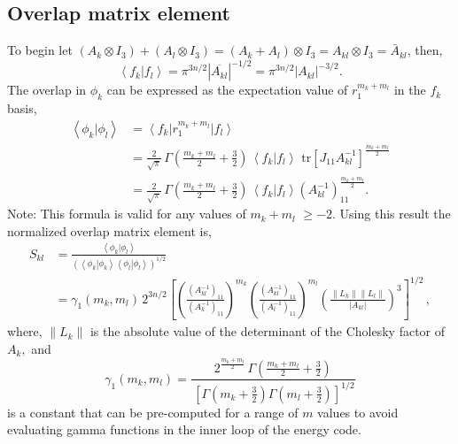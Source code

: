 \documentclass[12pt]{article}
\begin{document}
\subsection{Overlap matrix element}

To begin let $\left(  A_{k}\otimes I_{3}\right)  +\left(  A_{l}\otimes
I_{3}\right)  =\left(  A_{k}+A_{l}\right)  \otimes I_{3}=A_{kl}\otimes
I_{3}=\bar{A}_{kl}$, then,
\begin{equation}
\left\langle f_{k}\right.  |\left.  f_{l}\right\rangle =\pi^{3n/2}\left|
\overline{A_{kl}}\right|  ^{-1/2}=\pi^{3n/2}\left|  A_{kl}\right|  ^{-3/2}.
\end{equation}
The overlap in $\phi_{k}$ can be expressed as the expectation value of
$r_{1}^{m_{k}+m_{l}}$ in the $f_{k}$ basis,
\begin{align}
\left\langle \phi_{k}\right.  |\left.  \phi_{l}\right\rangle  &  =\left\langle
f_{k}\right|  r_{1}^{m_{k}+m_{l}}\left|  f_{l}\right\rangle \label{ov1}\\
&  =\frac{2}{\sqrt{\pi}}\,\Gamma\left(  \frac{m_{k}+m_{l}}{2}+\frac{3}%
{2}\right)  \,\left\langle f_{k}\right.  |\left.  f_{l}\right\rangle
\,\,\mathrm{tr}\left[  J_{11}A_{kl}^{-1}\right]  ^{\frac{m_{k}+m_{l}}{2}%
}\nonumber\\
&  =\frac{2}{\sqrt{\pi}}\,\Gamma\left(  \frac{m_{k}+m_{l}}{2}+\frac{3}%
{2}\right)  \,\left\langle f_{k}\right.  |\left.  f_{l}\right\rangle \left(
A_{kl}^{-1}\right)  _{11}^{\frac{m_{k}+m_{l}}{2}}.\nonumber
\end{align}
Note: This formula is valid for any values of $m_{k}+m_{l}$ $\geqslant-2.$
Using this result the normalized overlap matrix element is,
\begin{align}
S_{kl} &  =\frac{\left\langle \phi_{k}\right.  |\left.  \phi_{l}\right\rangle
}{\left(  \left\langle \phi_{k}\right.  |\left.  \phi_{k}\right\rangle
\left\langle \phi_{l}\right.  |\left.  \phi_{l}\right\rangle \right)  ^{1/2}%
}\label{Skl}\\
&  =\gamma_{1}\left(  m_{k},m_{l}\right)  \,2^{3n/2}\left[  \left(
\frac{\left(  A_{kl}^{-1}\right)  _{11}}{\left(  A_{k}^{-1}\right)  _{11}%
}\right)  ^{m_{k}}\left(  \frac{\left(  A_{kl}^{-1}\right)  _{11}}{\left(
A_{l}^{-1}\right)  _{11}}\right)  ^{m_{l}}\left(  \frac{\left\|
L_{k}\right\|  \left\|  L_{l}\right\|  }{\left|  A_{kl}\right|  }\right)
^{3}\right]  ^{1/2}\,,\nonumber
\end{align}
where, $\left\|  L_{k}\right\|  $ is the absolute value of the determinant of
the Cholesky factor of $A_{k},$ and
\begin{equation}
\gamma_{1}\left(  m_{k},m_{l}\right)  =\frac{2^{\frac{m_{k}+m_{l}}{2}}%
\,\Gamma\left(  \frac{m_{k}+m_{l}}{2}+\frac{3}{2}\right)  }{\,\left[
\Gamma\left(  m_{k}+\frac{3}{2}\right)  \Gamma\left(  m_{l}+\frac{3}%
{2}\right)  \right]  ^{1/2}}%
\end{equation}
is a constant that can be pre-computed for a range of $m$ values to avoid
evaluating gamma functions in the inner loop of the energy code.
\end{document}
